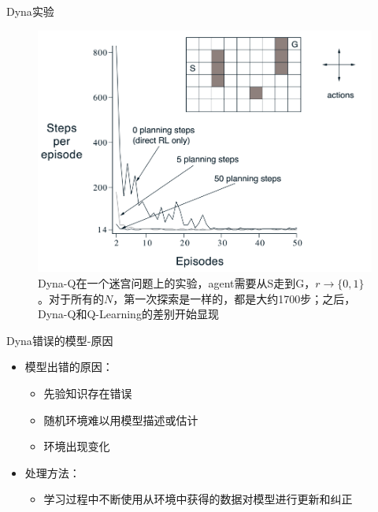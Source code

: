 \documentclass[10pt]{beamer}
\begin{document}
	\begin{frame}{Dyna}{实验}
		\begin{figure}
			\centering
			\includegraphics[width=0.7\linewidth]{pictures/dyna-exp}
			\caption[Dnya-Q 迷宫]{Dyna-Q在一个迷宫问题上的实验，agent需要从S走到G，$r\rightarrow \{0,1\}$。对于所有的$N$，第一次探索是一样的，都是大约1700步；之后，Dyna-Q和Q-Learning的差别开始显现}
			\label{fig:dyna-exp}
		\end{figure}
	\end{frame}

	\begin{frame}{Dyna}{错误的模型-原因}
		\begin{itemize}
			\item 模型出错的原因：
				\begin{itemize}
					\item 先验知识存在错误
					\item 随机环境难以用模型描述或估计
					\item 环境出现变化
				\end{itemize}
			\item 处理方法：
				\begin{itemize}
					\item 学习过程中不断使用从环境中获得的数据对模型进行更新和纠正
				\end{itemize}
		\end{itemize}
	\end{frame}
	
\end{document}
